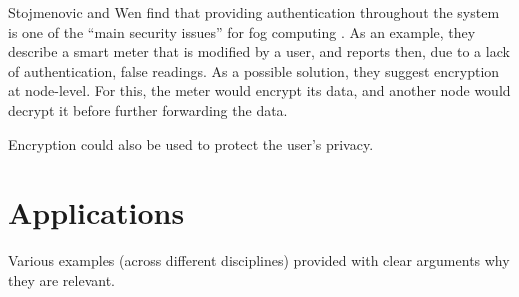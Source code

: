 \documentclass{article}
\begin{document}
Stojmenovic and Wen \cite{stojmenovic2014fog} find that providing authentication throughout the system is one of the ``main security issues'' for fog computing . As an example, they describe a smart meter that is modified by a user, and reports then, due to a lack of authentication, false readings. As a possible solution, they suggest encryption at node-level. For this, the meter would encrypt its data, and another node would decrypt it before further forwarding the data.

Encryption could also be used to protect the user's privacy.


\section{Applications}
Various examples (across different disciplines) provided with clear arguments why they are relevant.

\renewcommand{\refname}{\section{References}}


\end{document}
